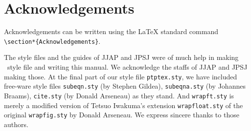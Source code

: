  

\section*{Acknowledgements}
Acknowledgements can be written using the LaTeX standard command
 \newline
\verb+\section*{Acknowledgements}+.

The style files and the guides of JJAP and JPSJ were of much help in
making \PTPTeX\ style file and writing this manual. 
We acknowledge the staffs of JJAP and JPSJ making those.
At the final part of our style file {\tt ptptex.sty}, 
we have included free-ware
style files {\tt subeqn.sty} (by Stephen Gildea), 
{\tt subeqna.sty} (by Johannes Braams), 
{\tt cite.sty} (by Donald Arseneau) as they stand. And 
{\tt wrapft.sty} is merely a modified version of 
Tetsuo Iwakuma's extension {\tt wrapfloat.sty} of the original 
{\tt wrapfig.sty} by Donald Arseneau. We express sincere thanks to
those authors.  


